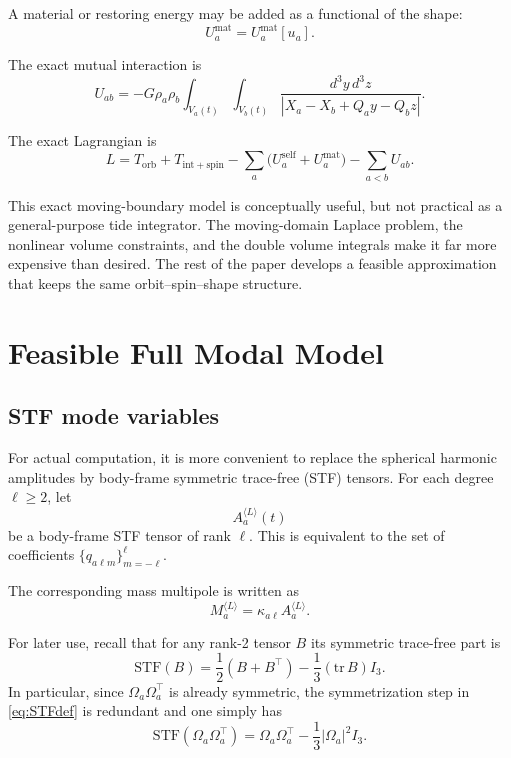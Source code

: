 \documentclass[journal, a4paper]{IEEEtran}
\begin{document}
A material or restoring energy may be added as a functional of the shape:
\begin{equation}
U_a^{\mathrm{mat}} = U_a^{\mathrm{mat}}[u_a].
\label{eq:Umat}
\end{equation}

The exact mutual interaction is
\begin{equation}
U_{ab}
=
-G\rho_a\rho_b
\int_{V_a(t)}\int_{V_b(t)}
\frac{d^3y\,d^3z}
{|X_a-X_b+Q_a y-Q_b z|}.
\label{eq:UabExact}
\end{equation}

The exact Lagrangian is
\begin{equation}
L
=
T_{\mathrm{orb}} + T_{\mathrm{int+spin}}
-\sum_a \bigl(U_a^{\mathrm{self}}+U_a^{\mathrm{mat}}\bigr)
-\sum_{a<b}U_{ab}.
\label{eq:Lexact}
\end{equation}

This exact moving-boundary model is conceptually useful, but not practical
as a general-purpose tide integrator. The moving-domain Laplace
problem, the nonlinear volume constraints, and the double volume integrals
make it far more expensive than desired. The rest of the paper develops a
feasible approximation that keeps the same orbit--spin--shape structure.

\section{Feasible Full Modal Model}

\subsection{STF mode variables}

For actual computation, it is more convenient to replace the spherical
harmonic amplitudes by body-frame symmetric trace-free (STF) tensors.
For each degree $\ell\ge2$, let
\begin{equation}
A_a^{\langle L\rangle}(t)
\end{equation}
be a body-frame STF tensor of rank $\ell$. This is equivalent to the set of
coefficients $\{q_{a\ell m}\}_{m=-\ell}^{\ell}$.

The corresponding mass multipole is written as
\begin{equation}
M_a^{\langle L\rangle}
=
\kappa_{a\ell} A_a^{\langle L\rangle}.
\label{eq:mass-multipole}
\end{equation}

For later use, recall that for any rank-2 tensor $B$ its symmetric
trace-free part is
\begin{equation}
\mathrm{STF}(B)
=
\frac{1}{2}(B+B^\top)
-
\frac{1}{3}(\mathrm{tr}\,B)I_3.
\label{eq:STFdef}
\end{equation}
In particular, since $\Omega_a\Omega_a^\top$ is already symmetric, the
symmetrization step in \eqref{eq:STFdef} is redundant and one simply has
\begin{equation}
\mathrm{STF}(\Omega_a\Omega_a^\top)
=
\Omega_a\Omega_a^\top
-
\frac{1}{3}|\Omega_a|^2 I_3.
\label{eq:STFOmega}
\end{equation}
\end{document}
